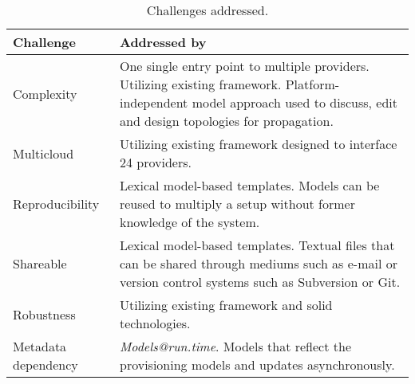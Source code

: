 \begin{table}
  \caption{Challenges addressed.}
  \begin{tabular}{ | l | p{9cm} | }
    \hline
    \textbf{Challenge} & \textbf{Addressed by} \\ \hline
    Complexity & One single entry point to multiple providers.
      Utilizing existing framework.
      Platform-independent model approach
      used to discuss, edit and design topologies for propagation.
      \\ \hline
    Multicloud &  Utilizing existing framework designed to interface 24 providers. \\ \hline
    Reproducibility & Lexical model-based templates.
      Models can be reused to multiply a setup without former knowledge of the system. \\ \hline
    Shareable & Lexical model-based templates.
      Textual files that can be shared through mediums such as e-mail or version control systems
      such as Subversion or Git. \\ \hline
    Robustness & Utilizing existing framework and solid technologies. \\ \hline
    Metadata dependency & \emph{Models@run.time}.
      Models that reflect the provisioning models and updates asynchronously. \\ 
    \hline
  \end{tabular}
  \label{table:challenges}
\end{table}
